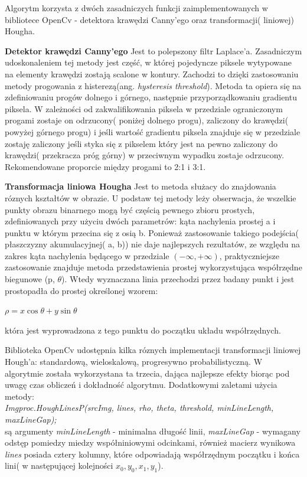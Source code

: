 \documentclass[a4paper,12pt]{article}
\begin{document}
		        \newpage
		
		        Algorytm korzysta z dwóch zasadniczych funkcji zaimplementowanych w bibliotece OpenCv - detektora krawędzi Canny'ego oraz transformacji( liniowej) Hougha. \par
		
		        \textbf{Detektor krawędzi Canny'ego} 
		        Jest to polepszony filtr Laplace'a. Zasadniczym udoskonaleniem tej metody jest część, w której pojedyncze piksele wytypowane na elementy krawędzi zostają scalone w kontury. Zachodzi to dzięki zastosowaniu metody progowania z histerezą(ang. \textit{hysteresis threshold}). Metoda ta opiera się na zdefiniowaniu progów dolnego i górnego, następnie przyporządkowaniu gradientu piksela. W zależności od zakwalifikowania piksela w przedziale ograniczonym progami zostaje on odrzucony( poniżej dolnego progu), zaliczony do krawędzi( powyżej górnego progu) i jeśli wartość gradientu piksela znajduje się w przedziale zostaję zaliczony jeśli styka się z pikselem który jest na pewno zaliczony do krawędzi( przekracza próg górny) w przeciwnym wypadku zostaje odrzucony. Rekomendowane proporcie między progami to 2:1 i 3:1. \par
		
        		\textbf{Transformacja liniowa Hougha} Jest to metoda służacy do znajdowania róznych kształtów w obrazie. U podstaw tej metody leży obserwacja, że wszelkie punkty obrazu binarnego mogą być częścią pewnego zbioru prostych, zdefiniowanych przy użyciu dwóch parametrów: kąta nachylenia prostej a i punktu w którym przecina się z osią b. 
		        Ponieważ zastosowanie takiego podejścia( płaszczyzny akumulacyjnej( a, b)) nie daje najlepszych rezultatów, ze względu na zakres kąta nachylenia będącego w przedziale $(-\infty, +\infty)$, praktyczniejsze zastosowanie znajduje metoda przedstawienia prostej wykorzystująca współrzędne biegunowe (p, $\theta$). Wtedy wyznaczana linia przechodzi przez badany punkt i jest prostopadła do prostej określonej wzorem:
		        \begin{center}
		        $\rho = x \cos \theta + y \sin \theta$ 
		        \end{center} 
		        która jest wyprowadzona z tego punktu do początku układu współrzędnych.
		
		        Biblioteka OpenCv udostępnia kilka róznych implementacji transformacji liniowej Hough'a: standardową, wieloskalową, progresywno probabilistyczną.
		        W algorytmie została wykorzystana ta trzecia, dająca najlepsze efekty biorąc pod uwagę czas obliczeń i dokładność algorytmu. Dodatkowymi zaletami użycia metody:\\ \textit {Imgproc.HoughLinesP(srcImg, lines, rho, theta, threshold, minLineLength, maxLineGap);}\\
		        są argumenty \textit{minLineLength} - minimalna długość linii, \textit{maxLineGap} - wymagany odstęp pomiedzy miedzy współniniowymi odcinkami, również macierz wynikowa \textit{lines} posiada cztery kolumny, które odpowiadają współrzędnym początku i końca lini( w następującej kolejności $ x_0, y_0, x_1, y_1 $).
		
\end{document}
